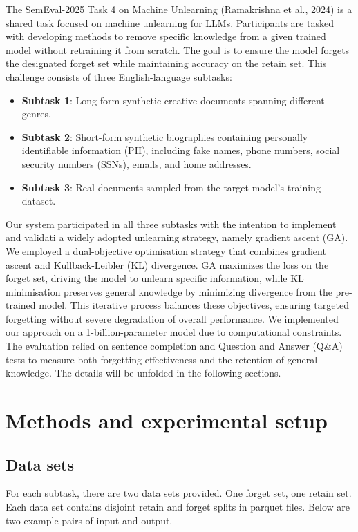 \documentclass[11pt]{article}
\begin{document}
The SemEval-2025 Task 4 on Machine Unlearning (Ramakrishna et al., 2024) is a shared task focused on machine unlearning for LLMs. Participants are tasked with developing methods to remove specific knowledge from a given trained model without retraining it from scratch. The goal is to ensure the model forgets the designated forget set while maintaining accuracy on the retain set. This challenge consists of three English-language subtasks:
\begin{itemize}
    \item \textbf{Subtask 1}: Long-form synthetic creative documents spanning different genres. 
    \item \textbf{Subtask 2}: Short-form synthetic biographies containing personally identifiable information (PII), including fake names, phone numbers, social security numbers (SSNs), emails, and home addresses. 
    \item \textbf{Subtask 3}: Real documents sampled from the target model’s training dataset. 
\end{itemize}

Our system participated in all three subtasks with the intention to implement and validati a widely adopted unlearning strategy, namely gradient ascent (GA). We employed a dual-objective optimisation strategy that combines gradient ascent and Kullback-Leibler (KL) divergence. GA maximizes the loss on the forget set, driving the model to unlearn specific information, while KL minimisation preserves general knowledge by minimizing divergence from the pre-trained model. This iterative process balances these objectives, ensuring targeted forgetting without severe degradation of overall performance. We implemented our approach on a 1-billion-parameter model due to computational constraints. The evaluation relied on sentence completion and Question and Answer (Q\&A) tests to measure both forgetting effectiveness and the retention of general knowledge. The details will be unfolded in the following sections.




\section{Methods and experimental setup}

\subsection*{Data sets}
For each subtask, there are two data sets provided. One forget set, one retain set. Each data set contains disjoint retain and forget splits in parquet files. Below are two example pairs of input and output.
\end{document}
